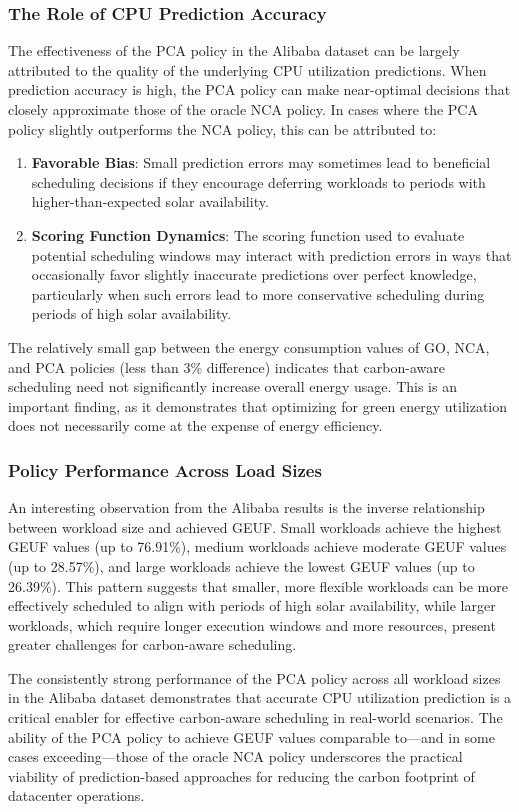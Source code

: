 \subsubsection{The Role of CPU Prediction Accuracy}

The effectiveness of the PCA policy in the Alibaba dataset can be largely attributed to the quality of the underlying CPU utilization predictions. When prediction accuracy is high, the PCA policy can make near-optimal decisions that closely approximate those of the oracle NCA policy. In cases where the PCA policy slightly outperforms the NCA policy, this can be attributed to:

\begin{enumerate}
    \item \textbf{Favorable Bias}: Small prediction errors may sometimes lead to beneficial scheduling decisions if they encourage deferring workloads to periods with higher-than-expected solar availability.
    
    \item \textbf{Scoring Function Dynamics}: The scoring function used to evaluate potential scheduling windows may interact with prediction errors in ways that occasionally favor slightly inaccurate predictions over perfect knowledge, particularly when such errors lead to more conservative scheduling during periods of high solar availability.
\end{enumerate}

The relatively small gap between the energy consumption values of GO, NCA, and PCA policies (less than 3\% difference) indicates that carbon-aware scheduling need not significantly increase overall energy usage. This is an important finding, as it demonstrates that optimizing for green energy utilization does not necessarily come at the expense of energy efficiency.

\subsubsection{Policy Performance Across Load Sizes}

An interesting observation from the Alibaba results is the inverse relationship between workload size and achieved GEUF. Small workloads achieve the highest GEUF values (up to 76.91\%), medium workloads achieve moderate GEUF values (up to 28.57\%), and large workloads achieve the lowest GEUF values (up to 26.39\%). This pattern suggests that smaller, more flexible workloads can be more effectively scheduled to align with periods of high solar availability, while larger workloads, which require longer execution windows and more resources, present greater challenges for carbon-aware scheduling.

The consistently strong performance of the PCA policy across all workload sizes in the Alibaba dataset demonstrates that accurate CPU utilization prediction is a critical enabler for effective carbon-aware scheduling in real-world scenarios. The ability of the PCA policy to achieve GEUF values comparable to—and in some cases exceeding—those of the oracle NCA policy underscores the practical viability of prediction-based approaches for reducing the carbon footprint of datacenter operations.
